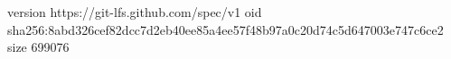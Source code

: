 version https://git-lfs.github.com/spec/v1
oid sha256:8abd326cef82dcc7d2eb40ee85a4ee57f48b97a0c20d74c5d647003e747c6ce2
size 699076
